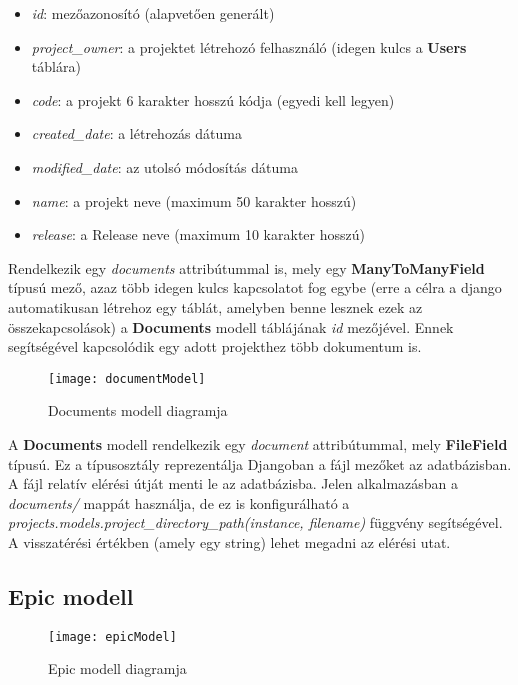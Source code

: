 \begin{itemize}
	\item \textit{id}: mezőazonosító (alapvetően generált)
	\item \textit{project\_owner}: a projektet létrehozó felhasználó (idegen kulcs a \textbf{Users} táblára)
	\item \textit{code}: a projekt 6 karakter hosszú kódja (egyedi kell legyen)
	\item \textit{created\_date}: a létrehozás dátuma
	\item \textit{modified\_date}: az utolsó módosítás dátuma
	\item \textit{name}: a projekt neve (maximum 50 karakter hosszú)
	\item \textit{release}: a Release neve (maximum 10 karakter hosszú)
\end{itemize}

Rendelkezik egy \textit{documents} attribútummal is, mely egy \textbf{ManyToManyField} típusú mező, azaz több idegen kulcs kapcsolatot fog egybe (erre a célra a django automatikusan létrehoz egy táblát, amelyben benne lesznek ezek az összekapcsolások) a \textbf{Documents} modell táblájának \textit{id} mezőjével. Ennek segítségével kapcsolódik egy adott projekthez több dokumentum is.

\begin{figure}[H]
	\centering
	\texttt{[image: documentModel]}
	\caption{Documents modell diagramja}
	\label{fig:docmodel}
\end{figure}

A \textbf{Documents} modell rendelkezik egy \textit{document} attribútummal, mely \textbf{FileField} típusú. Ez a típusosztály reprezentálja Djangoban a fájl mezőket az adatbázisban. A fájl relatív elérési útját menti le az adatbázisba. Jelen alkalmazásban a \textit{documents/} mappát használja, de ez is konfigurálható a \textit{projects.models.project\_directory\_path(instance, filename)} függvény segítségével. A visszatérési értékben (amely egy string) lehet megadni az elérési utat.

\subsection{Epic modell}

\begin{figure}[H]
	\centering
	\texttt{[image: epicModel]}
	\caption{Epic modell diagramja}
	\label{fig:epicmodel}
\end{figure}

